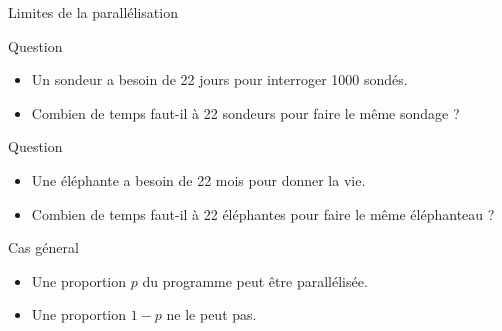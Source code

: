 
\begingroup


\begin{frame}{Limites de la parallélisation}
  \begin{alertblock}{Question}
    \begin{itemize}
    \item Un sondeur a besoin de 22 jours pour interroger 1000 sondés.
    \item Combien de temps faut-il à 22 sondeurs pour faire le même sondage ?
    \end{itemize}
  \end{alertblock}
  \pause
  \begin{alertblock}{Question}
    \begin{itemize}
    \item Une éléphante a besoin de 22 mois pour donner la vie.
    \item Combien de temps faut-il à 22 éléphantes pour faire le même éléphanteau ?
    \end{itemize}
  \end{alertblock}
  \pause
  \begin{block}{Cas géneral}
    \begin{itemize}
    \item Une proportion $p$ du programme peut être parallélisée.
    \item Une proportion $1-p$ ne le peut pas.
    \end{itemize}
  \end{block}
\end{frame}

\endgroup
\endinput
